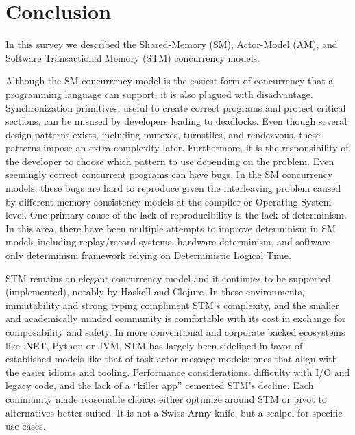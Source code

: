 \section{Conclusion\label{sec:conclusion}}
In this survey we described the Shared-Memory (SM),
Actor-Model (AM), and Software Transactional Memory (STM)
concurrency models.

Although the SM concurrency model is the
easiest form of concurrency that a programming language
can support, it is also plagued with disadvantage.
Synchronization primitives, useful to create
correct programs and protect critical sections, can be
misused by developers leading to deadlocks. Even though
several design patterns exists, including mutexes, turnstiles,
and rendezvous, these patterns impose an extra
complexity later. Furthermore, it is
the responsibility
of the developer to choose which pattern to use depending
on the problem. Even seemingly correct concurrent programs
can have bugs. In the SM concurrency models, these bugs
are hard to reproduce given the interleaving problem
caused by different memory consistency models at the compiler
or Operating System level. One primary cause of the lack
of reproducibility is the lack of determinism. In this area, there
have been multiple attempts to improve determinism in SM models
including replay/record systems, hardware determinism,
and software only determinism framework relying on 
Deterministic Logical Time.

STM remains an elegant concurrency model and it
continues to be supported (implemented), notably by Haskell and Clojure.
In these environments, immutability and strong typing compliment STM’s complexity,
and the smaller and academically minded community is comfortable with its cost
in exchange for composability and safety. In more conventional and corporate
backed ecosystems like .NET, Python or JVM, STM has largely been sidelined
in favor of established models like that of task-actor-message models;
ones that align with the easier idioms and tooling.
Performance considerations, difficulty with I/O and legacy code,
and the lack of a “killer app” cemented STM’s decline.
Each community made reasonable choice: either optimize
around STM or pivot to alternatives better suited.
It is not a Swiss Army knife, but a scalpel for specific use cases.
